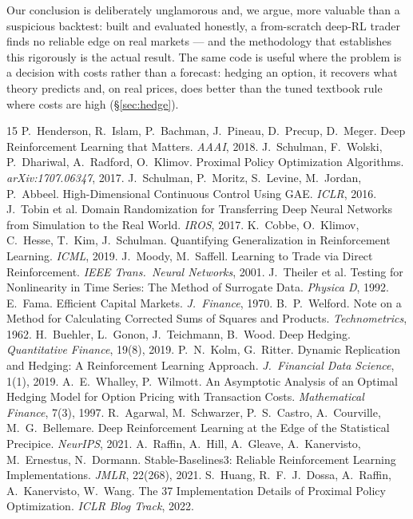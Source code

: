 \documentclass[10pt,twocolumn]{article}
\begin{document}
Our conclusion is deliberately unglamorous and, we argue, more
valuable than a suspicious backtest: built and evaluated honestly, a from-scratch
deep-RL trader finds no reliable edge on real markets --- and the methodology that
establishes this rigorously is the actual result. The same code is useful where
the problem is a decision with costs rather than a forecast: hedging an option, it
recovers what theory predicts and, on real prices, does better than the tuned
textbook rule where costs are high (\S\ref{sec:hedge}).

\begin{thebibliography}{15}\small
{} P.~Henderson, R.~Islam, P.~Bachman, J.~Pineau, D.~Precup,
  D.~Meger. Deep Reinforcement Learning that Matters. \emph{AAAI}, 2018.
 J.~Schulman, F.~Wolski, P.~Dhariwal, A.~Radford, O.~Klimov.
  Proximal Policy Optimization Algorithms. \emph{arXiv:1707.06347}, 2017.
 J.~Schulman, P.~Moritz, S.~Levine, M.~Jordan, P.~Abbeel.
  High-Dimensional Continuous Control Using GAE. \emph{ICLR}, 2016.
 J.~Tobin et al. Domain Randomization for Transferring Deep
  Neural Networks from Simulation to the Real World. \emph{IROS}, 2017.
 K.~Cobbe, O.~Klimov, C.~Hesse, T.~Kim, J.~Schulman.
  Quantifying Generalization in Reinforcement Learning. \emph{ICML}, 2019.
 J.~Moody, M.~Saffell. Learning to Trade via Direct
  Reinforcement. \emph{IEEE Trans.\ Neural Networks}, 2001.
 J.~Theiler et al. Testing for Nonlinearity in Time Series:
  The Method of Surrogate Data. \emph{Physica D}, 1992.
 E.~Fama. Efficient Capital Markets. \emph{J.\ Finance}, 1970.
 B.~P.~Welford. Note on a Method for Calculating Corrected
  Sums of Squares and Products. \emph{Technometrics}, 1962.
 H.~Buehler, L.~Gonon, J.~Teichmann, B.~Wood. Deep Hedging.
  \emph{Quantitative Finance}, 19(8), 2019.
 P.~N.~Kolm, G.~Ritter. Dynamic Replication and Hedging: A
  Reinforcement Learning Approach. \emph{J.\ Financial Data Science}, 1(1), 2019.
 A.~E.~Whalley, P.~Wilmott. An Asymptotic Analysis of an Optimal
  Hedging Model for Option Pricing with Transaction Costs. \emph{Mathematical
  Finance}, 7(3), 1997.
 R.~Agarwal, M.~Schwarzer, P.~S.~Castro, A.~Courville,
  M.~G.~Bellemare. Deep Reinforcement Learning at the Edge of the Statistical
  Precipice. \emph{NeurIPS}, 2021.
 A.~Raffin, A.~Hill, A.~Gleave, A.~Kanervisto, M.~Ernestus,
  N.~Dormann. Stable-Baselines3: Reliable Reinforcement Learning Implementations.
  \emph{JMLR}, 22(268), 2021.
 S.~Huang, R.~F.~J.~Dossa, A.~Raffin, A.~Kanervisto, W.~Wang.
  The 37 Implementation Details of Proximal Policy Optimization. \emph{ICLR Blog
  Track}, 2022.
\end{thebibliography}
\end{document}
